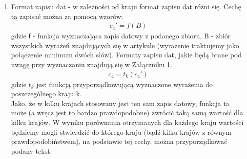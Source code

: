 \documentclass{classrep}
\begin{document}
\begin{enumerate}
    \item Format zapisu dat - w zależności od kraju format zapisu dat różni się. Cechę tą zapisać można za pomocą wzorów:
    \begin{gather}
        c_4' = f(B)
    \end{gather}
    \indent gdzie f - funkcja wyznaczająca zapis datowy z podanego zbioru, B - zbiór wszystkich wyrażeń znajdujących się w artykule (wyrażenie traktujemy jako połączenie minimum dwóch słów). Formaty zapisu dat, jakie będą brane pod uwagę przy wyznaczaniu znajdują się w Załączniku 1.
    \begin{gather}
        c_4 = t_k(c_4')
    \end{gather}
    \indent gdzie $t_k$ jest funkcją przyporządkowującą wyznaczone wyrażenia do poszczególnego kraju k.\\
    Jako, że w kilku krajach stosowany jest ten sam zapis datowy, funkcja ta może (a wręcz jest to bardzo prawdopodobne) zwrócić taką samą wartość dla kilku krajów. W wyniku porównania otrzymanych dla każdego kraju wartości będziemy mogli stwierdzić do którego kraju (bądź kilku krajów z równym prawdopodobiństwem), na podstawie tej cechy, można przyporządkować podany tekst. 
    \\
    

\end{enumerate}
\end{document}
